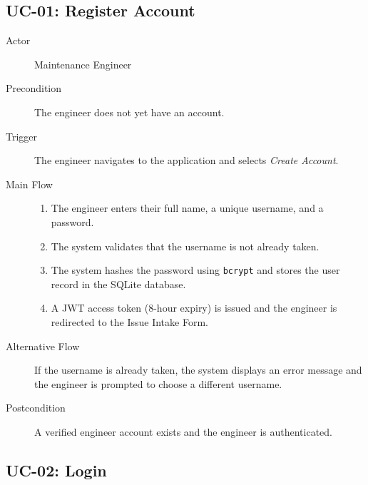 \subsection{UC-01: Register Account\label{sec:uc01}}

\begin{description}
    \item[Actor] Maintenance Engineer
    \item[Precondition] The engineer does not yet have an account.
    \item[Trigger] The engineer navigates to the application and selects \textit{Create Account}.
    \item[Main Flow]
        \begin{enumerate}[noitemsep]
            \item The engineer enters their full name, a unique username, and a password.
            \item The system validates that the username is not already taken.
            \item The system hashes the password using \texttt{bcrypt} and stores the user
                  record in the SQLite database.
            \item A JWT access token (8-hour expiry) is issued and the engineer is redirected
                  to the Issue Intake Form.
        \end{enumerate}
    \item[Alternative Flow]
        If the username is already taken, the system displays an error message and the
        engineer is prompted to choose a different username.
    \item[Postcondition] A verified engineer account exists and the engineer is authenticated.
\end{description}

\subsection{UC-02: Login\label{sec:uc02}}

